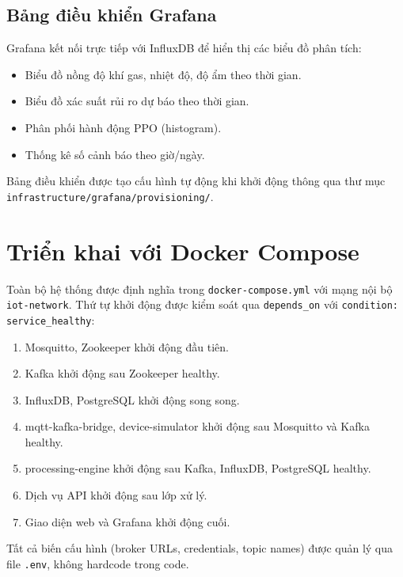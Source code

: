 \subsection{Bảng điều khiển Grafana}

Grafana kết nối trực tiếp với InfluxDB để hiển thị các biểu đồ phân tích:
\begin{itemize}
  \item Biểu đồ nồng độ khí gas, nhiệt độ, độ ẩm theo thời gian.
  \item Biểu đồ xác suất rủi ro dự báo theo thời gian.
  \item Phân phối hành động PPO (histogram).
  \item Thống kê số cảnh báo theo giờ/ngày.
\end{itemize}

Bảng điều khiển được tạo cấu hình tự động khi khởi động thông qua thư mục \texttt{infrastructure/grafana/provisioning/}.


\section{Triển khai với Docker Compose}

Toàn bộ hệ thống được định nghĩa trong \texttt{docker-compose.yml} với mạng nội bộ \texttt{iot-network}. Thứ tự khởi động được kiểm soát qua \texttt{depends\_on} với \texttt{condition: service\_healthy}:

\begin{enumerate}
  \item Mosquitto, Zookeeper khởi động đầu tiên.
  \item Kafka khởi động sau Zookeeper healthy.
  \item InfluxDB, PostgreSQL khởi động song song.
  \item mqtt-kafka-bridge, device-simulator khởi động sau Mosquitto và Kafka healthy.
  \item processing-engine khởi động sau Kafka, InfluxDB, PostgreSQL healthy.
  \item Dịch vụ API khởi động sau lớp xử lý.
  \item Giao diện web và Grafana khởi động cuối.
\end{enumerate}

Tất cả biến cấu hình (broker URLs, credentials, topic names) được quản lý qua file \texttt{.env}, không hardcode trong code.

